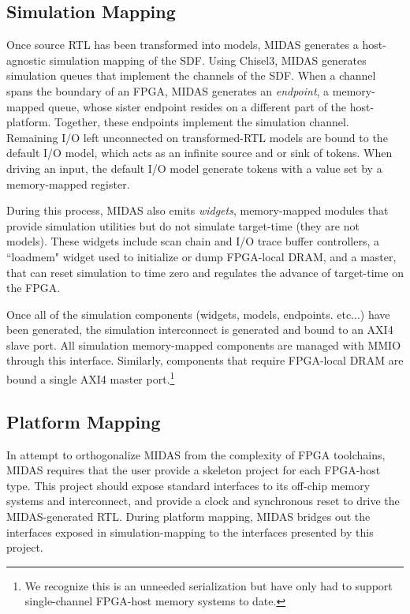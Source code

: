 \subsection{Simulation Mapping}

Once source RTL has been transformed into models, MIDAS generates a
host-agnostic simulation mapping of the SDF. Using Chisel3, MIDAS generates
simulation queues that implement the channels of the SDF. When a channel spans
the boundary of an FPGA, MIDAS generates an \emph{endpoint}, a memory-mapped
queue, whose sister endpoint resides on a different part of the host-platform.
Together, these endpoints implement the simulation channel.  Remaining I/O left
unconnected on transformed-RTL models are bound to the default I/O model, which
acts as an infinite source and or sink of tokens.  When driving an input, the
default I/O model generate tokens with a value set by a memory-mapped register.

During this process, MIDAS also emits \emph{widgets}, memory-mapped modules
that provide simulation utilities but do not simulate target-time (they are not
models). These widgets include scan chain and I/O trace buffer controllers, a
``loadmem" widget used to initialize or dump FPGA-local DRAM, and a master,
that can reset simulation to time zero and regulates the advance of target-time
on the FPGA.

Once all of the simulation components (widgets, models, endpoints. etc...) have
been generated, the simulation interconnect is generated and bound to an AXI4
slave port. All simulation memory-mapped components are managed with MMIO
through this interface. Similarly, components that require FPGA-local DRAM are
bound a single AXI4 master port.\footnote{We recognize this is an unneeded serialization but have only had to support single-channel FPGA-host memory systems to date.}

\subsection{Platform Mapping}

In attempt to orthogonalize MIDAS from the complexity of FPGA toolchains, MIDAS
requires that the user provide a skeleton project for each FPGA-host type. This
project should expose standard interfaces to its off-chip memory systems and
interconnect, and provide a clock and synchronous reset to drive the
MIDAS-generated RTL.  During platform mapping, MIDAS bridges out the interfaces
exposed in simulation-mapping to the interfaces presented by this project.

